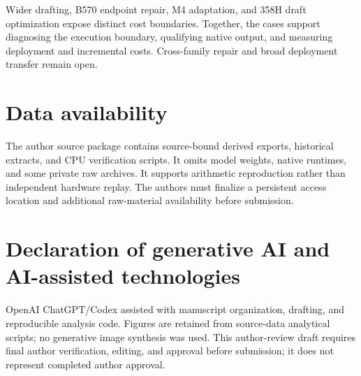 Wider drafting, B570 endpoint repair, M4 adaptation, and 358H draft optimization expose distinct cost boundaries. Together, the cases support diagnosing the execution boundary, qualifying native output, and measuring deployment and incremental costs. Cross-family repair and broad deployment transfer remain open.

\section*{Data availability}
The author source package contains source-bound derived exports, historical extracts, and CPU verification scripts. It omits model weights, native runtimes, and some private raw archives. It supports arithmetic reproduction rather than independent hardware replay. The authors must finalize a persistent access location and additional raw-material availability before submission.

\section*{Declaration of generative AI and AI-assisted technologies}
OpenAI ChatGPT/Codex assisted with manuscript organization, drafting, and reproducible analysis code. Figures are retained from source-data analytical scripts; no generative image synthesis was used. This author-review draft requires final author verification, editing, and approval before submission; it does not represent completed author approval.

